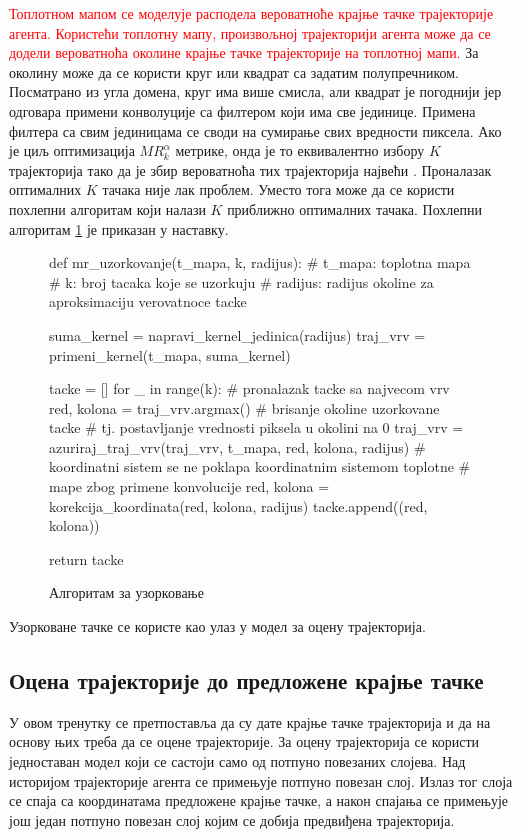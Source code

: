 \documentclass[11pt,oneside]{memoir}
\begin{document}
\textcolor{red}{Топлотном мапом се моделује расподела вероватноће крајње тачке трајекторије агента. Користећи топлотну мапу, 
произвољној трајекторији агента може да се додели вероватноћа околине крајње тачке трајекторије на топлотној мапи.} За околину може да се користи круг или квадрат са задатим 
полупречником. Посматрано из угла домена, круг има више смисла, али квадрат је погоднији јер одговара примени конволуције са филтером који има све јединице.
Примена филтера са свим јединицама се своди на сумирање свих вредности пиксела.
Ако је циљ оптимизација $MR^{\alpha}_{k}$ метрике, онда је то еквивалентно избору $K$ трајекторија тако да је збир вероватноћа 
тих трајекторија највећи \cite{home}. 
Проналазак оптималних $K$ тачака није лак проблем. Уместо тога може да се користи похлепни алгоритам који налази $K$ приближно оптималних
тачака. Похлепни алгоритам \ref{home-sampling-mr} је приказан у наставку.

\begin{figure}[H]
  \begin{python}
  def mr_uzorkovanje(t_mapa, k, radijus):
    # t_mapa: toplotna mapa
    # k: broj tacaka koje se uzorkuju
    # radijus: radijus okoline za aproksimaciju verovatnoce tacke

    suma_kernel = napravi_kernel_jedinica(radijus)
    traj_vrv = primeni_kernel(t_mapa, suma_kernel)
    
    tacke = []
    for _ in range(k):
      # pronalazak tacke sa najvecom vrv
      red, kolona = traj_vrv.argmax()  
      # brisanje okoline uzorkovane tacke
      # tj. postavljanje vrednosti piksela u okolini na 0
      traj_vrv = azuriraj_traj_vrv(traj_vrv, t_mapa, red, kolona, radijus)
      # koordinatni sistem se ne poklapa koordinatnim sistemom toplotne 
      # mape zbog primene konvolucije
      red, kolona = korekcija_koordinata(red, kolona, radijus)
      tacke.append((red, kolona))

    return tacke
  \end{python}
  \caption{Алгоритам за узорковање\label{home-sampling-mr}}
\end{figure}

Узорковане тачке се користе као улаз у модел за оцену трајекторија.
  
\subsection{Оцена трајекторије до предложене крајње тачке}

У овом тренутку се претпоставља да су дате крајње тачке трајекторија и да на основу њих треба да се оцене трајекторије. За оцену
трајекторија се користи једноставан модел који се састоји само од потпуно повезаних слојева. Над историјом трајекторије агента се
примењује потпуно повезан слој. Излаз тог слоја се спаја са координатама предложене крајње тачке, а након спајања се примењује још један
потпуно повезан слој којим се добија предвиђена трајекторија.
\end{document}
